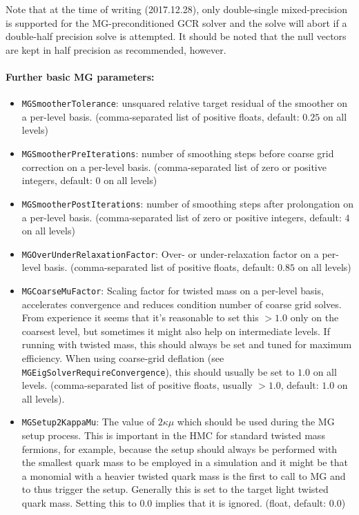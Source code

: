 Note that at the time of writing (2017.12.28), only double-single mixed-precision is supported for the MG-preconditioned GCR solver and the solve will abort if a double-half precision solve is attempted. It should be noted that the null vectors are kept in half precision as recommended, however.

\paragraph{Further basic MG parameters:}
\begin{itemize}
  \item{ \texttt{MGSmootherTolerance}: unsquared relative target residual of the smoother on a per-level basis. (comma-separated list of positive floats, default: $0.25$ on all levels) }
  \item{ \texttt{MGSmootherPreIterations}: number of smoothing steps before coarse grid correction on a per-level basis. (comma-separated list of zero or positive integers, default: $0$ on all levels)}
  \item{ \texttt{MGSmootherPostIterations}: number of smoothing steps after prolongation on a per-level basis. (comma-separated list of zero or positive integers, default: $4$ on all levels)}
  \item{ \texttt{MGOverUnderRelaxationFactor}: Over- or under-relaxation factor on a per-level basis. (comma-separated list of positive floats, default: $0.85$ on all levels)}
  \item{ \texttt{MGCoarseMuFactor}: Scaling factor for twisted mass on a per-level basis, accelerates convergence and reduces condition number of coarse grid solves. From experience it seems that it's reasonable to set this $>1.0$ only on the coarsest level, but sometimes it might also help on intermediate levels. If running with twisted mass, this should always be set and tuned for maximum efficiency. When using coarse-grid deflation (see \texttt{MGEigSolverRequireConvergence}), this should usually be set to $1.0$ on all levels. (comma-separated list of positive floats, usually $ > 1.0$, default: $1.0$ on all levels).}
  \item{ \texttt{MGSetup2KappaMu}: The value of $2\kappa\mu$ which should be used during the MG setup process. This is important in the HMC for standard twisted mass fermions, for example, because the setup should always be performed with the smallest quark mass to be employed in a simulation and it might be that a monomial with a heavier twisted quark mass is the first to call to MG and to thus trigger the setup. Generally this is set to the target light twisted quark mass. Setting this to $0.0$ implies that it is ignored. (float, default: $0.0$) }

\end{itemize}
